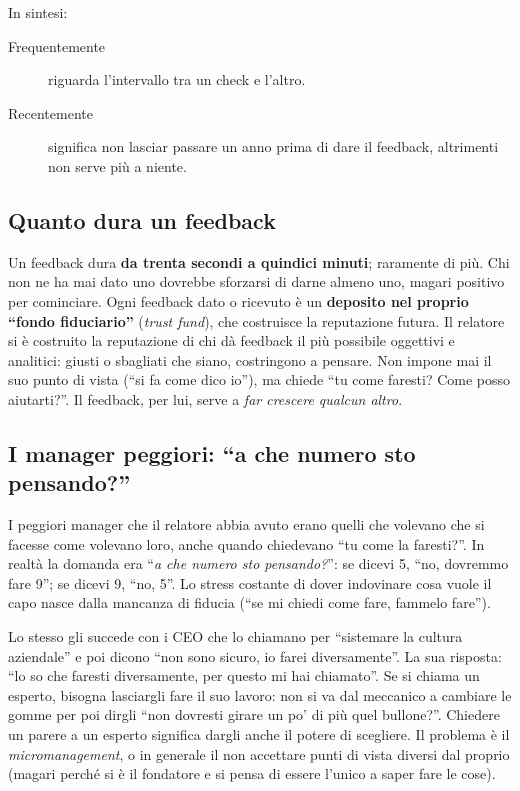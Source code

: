 In sintesi:
\begin{description}
  \item[Frequentemente] riguarda l'intervallo tra un check e l'altro.
  \item[Recentemente] significa non lasciar passare un anno prima di dare il
        feedback, altrimenti non serve più a niente.
\end{description}

\subsection{Quanto dura un feedback}

Un feedback dura \textbf{da trenta secondi a quindici minuti}; raramente di
più. Chi non ne ha mai dato uno dovrebbe sforzarsi di darne almeno uno, magari
positivo per cominciare. Ogni feedback dato o ricevuto è un
\textbf{deposito nel proprio ``fondo fiduciario''} (\emph{trust fund}), che
costruisce la reputazione futura. Il relatore si è costruito la reputazione di
chi dà feedback il più possibile oggettivi e analitici: giusti o sbagliati che
siano, costringono a pensare. Non impone mai il suo punto di vista (``si fa
come dico io''), ma chiede ``tu come faresti? Come posso aiutarti?''. Il
feedback, per lui, serve a \emph{far crescere qualcun altro}.

\subsection{I manager peggiori: ``a che numero sto pensando?''}

I peggiori manager che il relatore abbia avuto erano quelli che volevano che si
facesse come volevano loro, anche quando chiedevano ``tu come la faresti?''.
In realtà la domanda era ``\emph{a che numero sto pensando?}'': se dicevi 5,
``no, dovremmo fare 9''; se dicevi 9, ``no, 5''. Lo stress costante di dover
indovinare cosa vuole il capo nasce dalla mancanza di fiducia (``se mi chiedi
come fare, fammelo fare'').

Lo stesso gli succede con i CEO che lo chiamano per ``sistemare la cultura
aziendale'' e poi dicono ``non sono sicuro, io farei diversamente''. La sua
risposta: ``lo so che faresti diversamente, per questo mi hai chiamato''. Se si
chiama un esperto, bisogna lasciargli fare il suo lavoro: non si va dal
meccanico a cambiare le gomme per poi dirgli ``non dovresti girare un po' di
più quel bullone?''. Chiedere un parere a un esperto significa dargli anche il
potere di scegliere. Il problema è il \emph{micromanagement}, o in generale il
non accettare punti di vista diversi dal proprio (magari perché si è il
fondatore e si pensa di essere l'unico a saper fare le cose).

